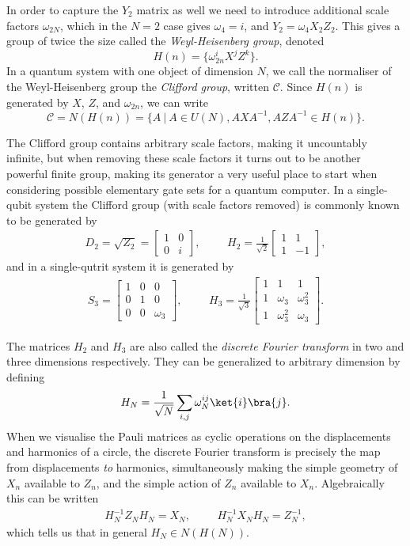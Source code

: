 In order to capture the $Y_2$ matrix as well we need to introduce additional scale factors $\omega_{2N}$, which in the $N=2$ case gives $\omega_4 = i$, and $Y_2 = \omega_{4}X_2Z_2$. This gives a group of twice the size called the \emph{Weyl-Heisenberg group}, denoted
\[H(n) = \{\omega_{2n}^iX^jZ^k\}.\]
In a quantum system with one object of dimension $N$, we call the normaliser of the Weyl-Heisenberg group the \emph{Clifford group}, written $\mathcal{C}$. Since $H(n)$ is generated by $X$, $Z$, and $\omega_{2n}$, we can write
\[\mathcal{C} = N(H(n)) = \{A\ |\ A \in U(N), AXA^{-1}, AZA^{-1} \in H(n)\}.\]

The Clifford group contains arbitrary scale factors, making it uncountably infinite, but when removing these scale factors it turns out to be another powerful finite group, making its generator a very useful place to start when considering possible elementary gate sets for a quantum computer. In a single-qubit system the Clifford group (with scale factors removed) is commonly known to be generated by
\begin{align*}
D_2 = \sqrt{Z_2} = \begin{bmatrix}
1 & 0 \\
0 & i
\end{bmatrix},
&&&
H_2 = \frac{1}{\sqrt{2}}\begin{bmatrix}
1 & 1 \\
1 & -1
\end{bmatrix},
\end{align*}
and in a single-qutrit system it is generated by
\begin{align*}
S_3 = \begin{bmatrix}
1 & 0 & 0 \\
0 & 1 & 0 \\
0 & 0 & \omega_3
\end{bmatrix},
&&&
H_3 = \frac{1}{\sqrt{3}}\begin{bmatrix}
1 & 1 & 1 \\
1 & \omega_3 & \omega_3^2 \\
1 & \omega_3^2 & \omega_3
\end{bmatrix}.
\end{align*}

The matrices $H_2$ and $H_3$ are also called the \emph{discrete Fourier transform} in two and three dimensions respectively. They can be generalized to arbitrary dimension by defining
\[H_N = \frac{1}{\sqrt{N}}\sum_{i,j} \omega_N^{ij}\ket{i}\bra{j}.\]
When we visualise the Pauli matrices as cyclic operations on the displacements and harmonics of a circle, the discrete Fourier transform is precisely the map from displacements \emph{to} harmonics, simultaneously making the simple geometry of $X_n$ available to $Z_n$, and the simple action of $Z_n$ available to $X_n$. Algebraically this can be written
\begin{align*}
H_N^{-1}Z_NH_N = X_N, &&& H_N^{-1}X_NH_N = Z_N^{-1},
\end{align*}
which tells us that in general $H_N \in N(H(N))$.

